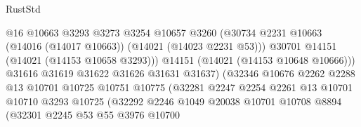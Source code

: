 \begin{lexlean}{RustStd}
\begin{coremodule}
                                          @16
                                          @10663
                                          @3293
                                          @3273
                                          @3254
                                          @10657
                                          @3260
                                          (@30734
                                            @2231
                                            @10663
                                            (@14016 (@14017 @10663))
                                            (@14021 (@14023 @2231 @53)))
                                          @30701
                                          @14151
                                          (@14021 (@14153 @10658 @3293)))
                                        @14151
                                        (@14021 (@14153 @10648 @10666)))
                                      @31616
                                      @31619
                                      @31622
                                      @31626
                                      @31631
                                      @31637)
                                    (@32346
                                      @10676
                                      @2262
                                      @2288
                                      @13
                                      @10701
                                      @10725
                                      @10751
                                      @10775
                                      (@32281
                                        @2247
                                        @2254
                                        @2261
                                        @13
                                        @10701
                                        @10710
                                        @3293
                                        @10725
                                        (@32292
                                          @2246
                                          @1049
                                          @20038
                                          @10701
                                          @10708
                                          @8894
                                          (@32301
                                            @2245
                                            @53
                                            @55
                                            @3976
                                            @10700

\end{coremodule}
\end{lexlean}

